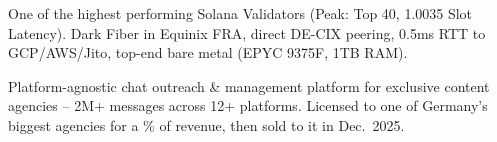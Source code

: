 \documentclass{cv-template}
\begin{document}
One of the highest performing Solana Validators (Peak: Top 40, 1.0035 Slot Latency). Dark Fiber in Equinix FRA, direct DE-CIX peering, 0.5ms RTT to GCP/AWS/Jito, top-end bare metal (EPYC 9375F, 1TB RAM).

\vspace{0.2em}

\vspace{0.1em}

Platform-agnostic chat outreach \& management platform for exclusive content agencies -- 2M+ messages across 12+ platforms. Licensed to one of Germany's biggest agencies for a \% of revenue, then sold to it in Dec.\ 2025.
\end{document}
